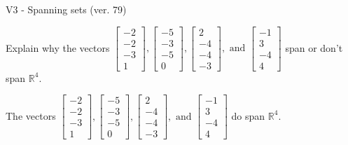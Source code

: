 \begin{exercise}
  \begin{exerciseTitle}V3 - Spanning sets (ver. 79)\end{exerciseTitle}
  \begin{exerciseStatement}
    Explain why the vectors \(\left[\begin{array}{r}
-2 \\
-2 \\
-3 \\
1
\end{array}\right] , \left[\begin{array}{r}
-5 \\
-3 \\
-5 \\
0
\end{array}\right] , \left[\begin{array}{r}
2 \\
-4 \\
-4 \\
-3
\end{array}\right] , \text{ and } \left[\begin{array}{r}
-1 \\
3 \\
-4 \\
4
\end{array}\right]\) span or don't span \(\mathbb{R}^4\). 
	


  \end{exerciseStatement}
  \begin{exerciseAnswer}
   The vectors \(\left[\begin{array}{r}
-2 \\
-2 \\
-3 \\
1
\end{array}\right] , \left[\begin{array}{r}
-5 \\
-3 \\
-5 \\
0
\end{array}\right] , \left[\begin{array}{r}
2 \\
-4 \\
-4 \\
-3
\end{array}\right] , \text{ and } \left[\begin{array}{r}
-1 \\
3 \\
-4 \\
4
\end{array}\right]\) 
  	 do  
	span \(\mathbb{R}^4\).
  


  \end{exerciseAnswer}
\end{exercise}